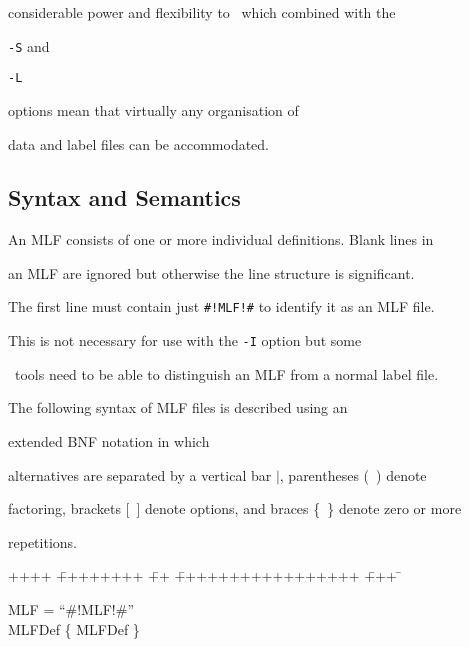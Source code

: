 considerable power and flexibility to \HTK\ which combined with the


\texttt{-S} and 


\texttt{-L} 


options mean that virtually any organisation of


data and label files can be accommodated. 





\subsection{Syntax and Semantics}





An MLF consists of one or more individual definitions.  Blank lines in


an MLF are ignored but otherwise the line structure is significant.


The first line must contain just \texttt{\#!MLF!\#} to identify it as an MLF file.


This is not necessary for use with the \texttt{-I} option but some 


\HTK\ tools need to be able to distinguish an MLF from a normal label file.


The following syntax of MLF files is described using an 


extended BNF notation in which


alternatives are separated by a vertical bar $|$, parentheses (\ ) denote


factoring, brackets [\ ] denote options, and braces \{\ \} denote zero or more


repetitions. 





{\sf


\begin{tabbing}


++++ \= ++++++++ \= ++ \= +++++++++++++++++ \= +++ \=  \kill


\>    MLF  =  \> ``\#!MLF!\#'' \\


\>\>  MLFDef \{ MLFDef \}


\end{tabbing}


}





